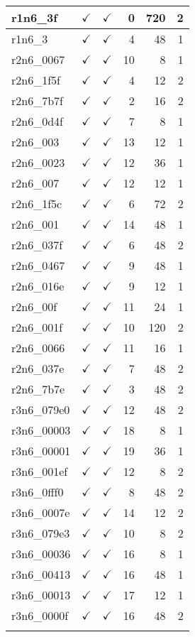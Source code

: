 \begin{center}
\begin{longtable}{|l|r|r|r|r|r|}
  r1n6\_3f & $\checkmark$ & $\checkmark$ & 0 & 720 & 2 \\ \hline
  r1n6\_3 & $\checkmark$ & $\checkmark$ & 4 & 48 & 1 \\ \hline
  r2n6\_0067 & $\checkmark$ & $\checkmark$ & 10 & 8 & 1 \\ \hline
  r2n6\_1f5f & $\checkmark$ & $\checkmark$ & 4 & 12 & 2 \\ \hline
  r2n6\_7b7f & $\checkmark$ & $\checkmark$ & 2 & 16 & 2 \\ \hline
  r2n6\_0d4f & $\checkmark$ & $\checkmark$ & 7 & 8 & 1 \\ \hline
  r2n6\_003 & $\checkmark$ & $\checkmark$ & 13 & 12 & 1 \\ \hline
  r2n6\_0023 & $\checkmark$ & $\checkmark$ & 12 & 36 & 1 \\ \hline
  r2n6\_007 & $\checkmark$ & $\checkmark$ & 12 & 12 & 1 \\ \hline
  r2n6\_1f5c & $\checkmark$ & $\checkmark$ & 6 & 72 & 2 \\ \hline
  r2n6\_001 & $\checkmark$ & $\checkmark$ & 14 & 48 & 1 \\ \hline
  r2n6\_037f & $\checkmark$ & $\checkmark$ & 6 & 48 & 2 \\ \hline
  r2n6\_0467 & $\checkmark$ & $\checkmark$ & 9 & 48 & 1 \\ \hline
  r2n6\_016e & $\checkmark$ & $\checkmark$ & 9 & 12 & 1 \\ \hline
  r2n6\_00f & $\checkmark$ & $\checkmark$ & 11 & 24 & 1 \\ \hline
  r2n6\_001f & $\checkmark$ & $\checkmark$ & 10 & 120 & 2 \\ \hline
  r2n6\_0066 & $\checkmark$ & $\checkmark$ & 11 & 16 & 1 \\ \hline
  r2n6\_037e & $\checkmark$ & $\checkmark$ & 7 & 48 & 2 \\ \hline
  r2n6\_7b7e & $\checkmark$ & $\checkmark$ & 3 & 48 & 2 \\ \hline
  r3n6\_079e0 & $\checkmark$ & $\checkmark$ & 12 & 48 & 2 \\ \hline
  r3n6\_00003 & $\checkmark$ & $\checkmark$ & 18 & 8 & 1 \\ \hline
  r3n6\_00001 & $\checkmark$ & $\checkmark$ & 19 & 36 & 1 \\ \hline
  r3n6\_001ef & $\checkmark$ & $\checkmark$ & 12 & 8 & 2 \\ \hline
  r3n6\_0fff0 & $\checkmark$ & $\checkmark$ & 8 & 48 & 2 \\ \hline
  r3n6\_0007e & $\checkmark$ & $\checkmark$ & 14 & 12 & 2 \\ \hline
  r3n6\_079e3 & $\checkmark$ & $\checkmark$ & 10 & 8 & 2 \\ \hline
  r3n6\_00036 & $\checkmark$ & $\checkmark$ & 16 & 8 & 1 \\ \hline
  r3n6\_00413 & $\checkmark$ & $\checkmark$ & 16 & 48 & 1 \\ \hline
  r3n6\_00013 & $\checkmark$ & $\checkmark$ & 17 & 12 & 1 \\ \hline
  r3n6\_0000f & $\checkmark$ & $\checkmark$ & 16 & 48 & 2 \\ \hline
\label{Tab:computational-results-1}
\end{longtable}


\end{center}
